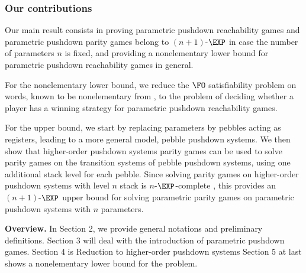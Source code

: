 \documentclass[a4paper,UKenglish,cleveref, autoref, thm-restate]{lipics-v2021}
\begin{document}

\subsubsection*{Our contributions}


Our main result consists in
proving parametric pushdown reachability games
and parametric pushdown parity games belong to $(n+1)$-$\EXP$ in case the number of parameters
$n$ is fixed,
and providing a nonelementary lower bound for parametric pushdown reachability games in general.



	For the nonelementary lower bound,
we reduce the $\FO$ satisfiability problem on words, known to be nonelementary
from \cite{Sto74}, to the
problem of deciding whether a player has a winning strategy for parametric pushdown reachability games. 

	For the upper bound, we start by replacing parameters by pebbles acting as registers, leading to a more general model, pebble pushdown systems.
 We then show that higher-order pushdown systems parity games can be used to solve parity games on
 the transition systems of pebble pushdown systems,
using one additional stack level for each pebble.
 Since solving parity games on higher-order pushdown systems with level $n$ stack is $n$-$\EXP$-complete \cite{ Cach03, cachat2007complexity}, this provides an $(n+1)$-$\EXP$ upper bound for solving parametric parity games on parametric pushdown systems with $n$ parameters.



{\bf Overview. }
In Section 2, we provide general notations and preliminary definitions. 
Section 3 will deal with the introduction of  parametric pushdown games.
Section 4 is Reduction to higher-order pushdown systems
Section 5 at last shows a nonelementary lower bound for the problem.
\end{document}
